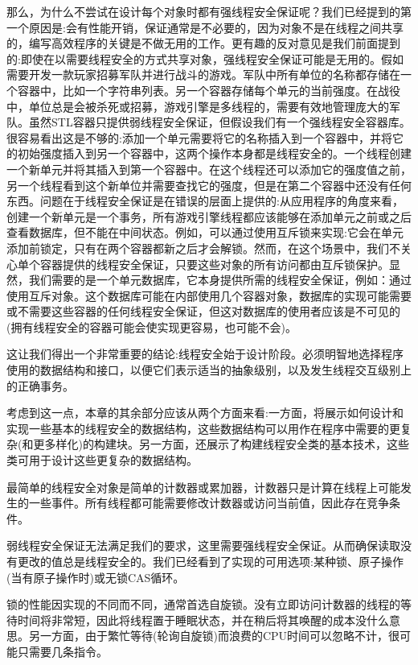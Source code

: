 那么，为什么不尝试在设计每个对象时都有强线程安全保证呢？我们已经提到的第一个原因是:会有性能开销，保证通常是不必要的，因为对象不是在线程之间共享的，编写高效程序的关键是不做无用的工作。更有趣的反对意见是我们前面提到的:即使在以需要线程安全的方式共享对象，强线程安全保证可能是无用的。假如需要开发一款玩家招募军队并进行战斗的游戏。军队中所有单位的名称都存储在一个容器中，比如一个字符串列表。另一个容器存储每个单元的当前强度。在战役中，单位总是会被杀死或招募，游戏引擎是多线程的，需要有效地管理庞大的军队。虽然STL容器只提供弱线程安全保证，但假设我们有一个强线程安全容器库。很容易看出这是不够的:添加一个单元需要将它的名称插入到一个容器中，并将它的初始强度插入到另一个容器中，这两个操作本身都是线程安全的。一个线程创建一个新单元并将其插入到第一个容器中。在这个线程还可以添加它的强度值之前，另一个线程看到这个新单位并需要查找它的强度，但是在第二个容器中还没有任何东西。问题在于线程安全保证是在错误的层面上提供的:从应用程序的角度来看，创建一个新单元是一个事务，所有游戏引擎线程都应该能够在添加单元之前或之后查看数据库，但不能在中间状态。例如，可以通过使用互斥锁来实现:它会在单元添加前锁定，只有在两个容器都新之后才会解锁。然而，在这个场景中，我们不关心单个容器提供的线程安全保证，只要这些对象的所有访问都由互斥锁保护。显然，我们需要的是一个单元数据库，它本身提供所需的线程安全保证，例如：通过使用互斥对象。这个数据库可能在内部使用几个容器对象，数据库的实现可能需要或不需要这些容器的任何线程安全保证，但这对数据库的使用者应该是不可见的(拥有线程安全的容器可能会使实现更容易，也可能不会)。

这让我们得出一个非常重要的结论:线程安全始于设计阶段。必须明智地选择程序使用的数据结构和接口，以便它们表示适当的抽象级别，以及发生线程交互级别上的正确事务。

考虑到这一点，本章的其余部分应该从两个方面来看:一方面，将展示如何设计和实现一些基本的线程安全的数据结构，这些数据结构可以用作在程序中需要的更复杂(和更多样化)的构建块。另一方面，还展示了构建线程安全类的基本技术，这些类可用于设计这些更复杂的数据结构。


最简单的线程安全对象是简单的计数器或累加器，计数器只是计算在线程上可能发生的一些事件。所有线程都可能需要修改计数器或访问当前值，因此存在竞争条件。

弱线程安全保证无法满足我们的要求，这里需要强线程安全保证。从而确保读取没有更改的值总是线程安全的。我们已经看到了实现的可用选项:某种锁、原子操作(当有原子操作时)或无锁CAS循环。

锁的性能因实现的不同而不同，通常首选自旋锁。没有立即访问计数器的线程的等待时间将非常短，因此将线程置于睡眠状态，并在稍后将其唤醒的成本没什么意思。另一方面，由于繁忙等待(轮询自旋锁)而浪费的CPU时间可以忽略不计，很可能只需要几条指令。

